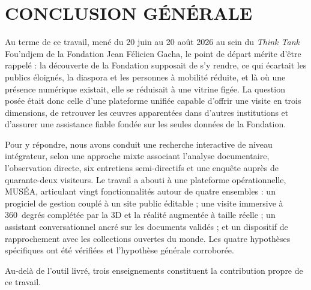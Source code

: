 \cleardoublepage
{}
\chapter*{CONCLUSION GÉNÉRALE}

Au terme de ce travail, mené du 20 juin au 20 août 2026 au sein du \emph{Think
Tank} Fou'ndjem de la Fondation Jean Félicien Gacha, le point de départ mérite
d'être rappelé : la découverte de la Fondation supposait de s'y rendre, ce qui
écartait les publics éloignés, la diaspora et les personnes à mobilité réduite,
et là où une présence numérique existait, elle se réduisait à une vitrine figée.
La question posée était donc celle d'une plateforme unifiée capable d'offrir une
visite en trois dimensions, de retrouver les œuvres apparentées dans d'autres
institutions et d'assurer une assistance fiable fondée sur les seules données de
la Fondation.

Pour y répondre, nous avons conduit une recherche interactive de niveau
intégrateur, selon une approche mixte associant l'analyse documentaire,
l'observation directe, six entretiens semi-directifs et une enquête auprès de
quarante-deux visiteurs. Le travail a abouti à une plateforme opérationnelle,
MUSÉA, articulant vingt fonctionnalités autour de quatre ensembles : un
progiciel de gestion couplé à un site public éditable ; une visite immersive à
360~degrés complétée par la 3D et la réalité augmentée à taille réelle ; un
assistant conversationnel ancré sur les documents validés ; et un dispositif de
rapprochement avec les collections ouvertes du monde. Les quatre hypothèses
spécifiques ont été vérifiées et l'hypothèse générale corroborée.

Au-delà de l'outil livré, trois enseignements constituent la contribution propre
de ce travail.

